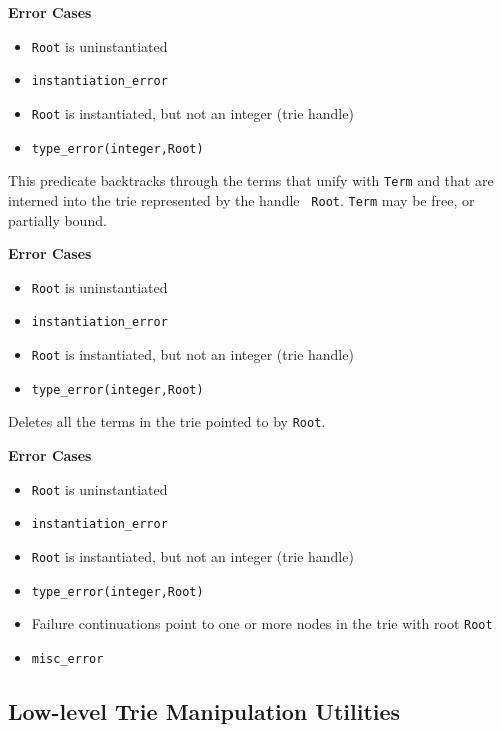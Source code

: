 {\begin{description}
{\bf Error Cases}
\begin{itemize}
\item 	{\tt Root} is uninstantiated
\bi
\item 	 {\tt instantiation\_error}
\ei
\item 	{\tt Root} is instantiated, but not an integer (trie handle)
\bi
\item 	 {\tt type\_error(integer,Root)}
\ei
\end{itemize}

This predicate backtracks through the terms that unify with {\tt Term}
and that are interned into the trie represented by the handle {\tt
  Root}.  {\tt Term} may be free, or partially bound.

{\bf Error Cases}
\begin{itemize}
\item 	{\tt Root} is uninstantiated
\bi
\item 	 {\tt instantiation\_error}
\ei
\item 	{\tt Root} is instantiated, but not an integer (trie handle)
\bi
\item 	 {\tt type\_error(integer,Root)}
\ei
\end{itemize}

Deletes all the terms in the trie pointed to by {\tt Root}.

{\bf Error Cases}
\begin{itemize}
\item 	{\tt Root} is uninstantiated
\bi
\item 	 {\tt instantiation\_error}
\ei
\item 	{\tt Root} is instantiated, but not an integer (trie handle)
\bi
\item 	 {\tt type\_error(integer,Root)}
\ei
\item 	Failure continuations point to one or more nodes in the trie with root {\tt Root}
\bi
\item 	{\tt misc\_error}
\ei
\end{itemize}
\end{description}


\subsection{Low-level Trie Manipulation Utilities} \label{sec:intern-advanced}

}
